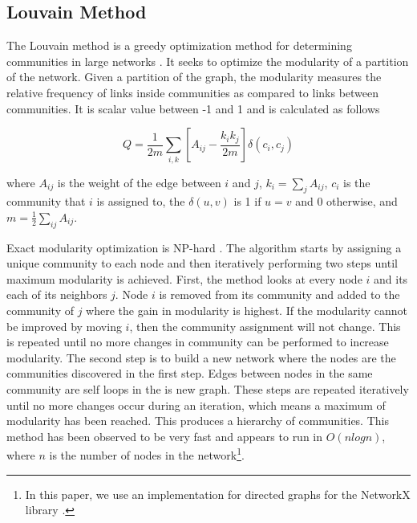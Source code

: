 \subsection{Louvain Method}
The Louvain method is a greedy optimization method for determining communities in large networks \cite{2008JSMTE..10..008B}. It seeks to optimize the modularity of a partition of the network. Given a partition of the graph, the modularity measures the relative frequency of links inside communities as compared to links between communities. It is scalar value between -1 and 1 and is calculated as follows

\begin{equation}
Q = \frac{1}{2m} \sum_{i,k} \left[ A_{ij} - \frac{k_i k_j}{2m}\right]\delta(c_i,c_j)
\end{equation}

where $A_{ij}$ is the weight of the edge between $i$ and $j$, $k_i = \sum_{j}A_{ij}$, $c_i$ is the community that $i$ is assigned to, the $\delta(u,v)$ is 1 if $u=v$ and 0 otherwise, and $m = \frac{1}{2}\sum_{ij}A_{ij}$. 

Exact modularity optimization is NP-hard \cite{2008JSMTE..10..008B}. The algorithm starts by assigning a unique community to each node and then iteratively performing two steps until maximum modularity is achieved. First, the method looks at every node $i$ and its each of its neighbors $j$. Node $i$ is removed from its community and added to the community of $j$ where the gain in modularity is highest. If the modularity cannot be improved by moving $i$, then the community assignment will not change. This is repeated until no more changes in community can be performed to increase modularity. The second step is to build a new network where the nodes are the communities discovered in the first step. Edges between nodes in the same community are self loops in the is new graph. These steps are repeated iteratively until no more changes occur during an iteration, which means a maximum of modularity has been reached. This produces a hierarchy of communities. This method has been observed to be very fast and appears to run in $O(nlogn)$\cite{2008JSMTE..10..008B}, where $n$ is the number of nodes in the network\footnote{In this paper, we use an implementation for directed graphs for the NetworkX library \cite{louvain}.}.



